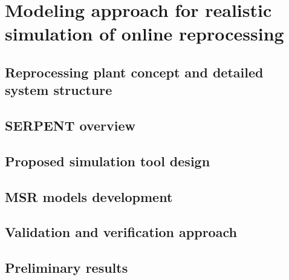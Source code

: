 \chapter[Modeling approach for realistic simulation of online reprocessing]{Modeling approach for realistic simulation of online reprocessing}

\section{Reprocessing plant concept and detailed system structure}

\section{SERPENT overview}

\section{Proposed simulation tool design}

\section{MSR models development}

\section{Validation and verification approach}

\section{Preliminary results}
